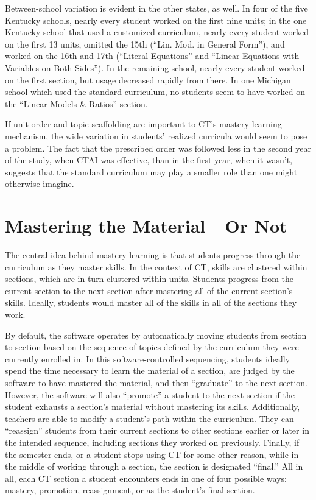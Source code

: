 \documentclass[notitlepage,12pt]{jedm}\usepackage[]{graphicx}\usepackage[]{color}
\begin{document}
Between-school variation is evident in the other states, as well.
In four of the five Kentucky schools, nearly every student worked on
the first nine units; in the one Kentucky school that used a
customized curriculum, nearly every student worked on the first 13
units, omitted the 15th (``Lin. Mod. in General Form''), and worked on
the 16th and 17th (``Literal Equations'' and ``Linear Equations with Variables on Both Sides'').
In the remaining school, nearly every student worked on the first
section, but usage decreased rapidly from there.
In one Michigan school which used the standard curriculum,
no students seem to have worked on the ``Linear Models \& Ratios'' section.

If unit order and topic scaffolding are important to CT's mastery
learning mechanism, the wide variation in students' realized curricula
would seem to pose a problem.
The fact that the prescribed order was followed less in the second
year of the study, when CTAI was effective, than in the first year,
when it wasn't, suggests that the standard curriculum may play a
smaller role than one might otherwise imagine.

\section{Mastering the Material---Or Not}\label{sec:mastery}
The central idea behind mastery learning is that students progress
through the curriculum as they master skills.
In the context of CT, skills are clustered within sections, which are
in turn clustered within units.
Students progress from the current section to the next section after
mastering all of the current section's skills.
Ideally, students would master all of the skills in all of the
sections they work.

By default, the software operates by automatically moving students
from section to section based on the sequence of topics defined by the
curriculum they were currently enrolled in. In this
software-controlled sequencing, students ideally spend the time
necessary to learn the material of a section, are judged by the
software to have mastered the material, and then ``graduate'' to the
next section.
However, the software will also ``promote'' a student to the next
section if the student exhausts a section's material without mastering
its skills.
Additionally, teachers are able to modify a student's path within the curriculum.
They can ``reassign'' students from their current sections to other
sections earlier or later in the intended sequence, including sections
they worked on previously.
Finally, if the semester ends, or a student stops using CT for some
other reason, while in the middle of working through a
section, the section is designated ``final.''
All in all, each CT section a student encounters ends in one of four possible ways:
mastery, promotion, reassignment, or as the student's final section.
\end{document}
